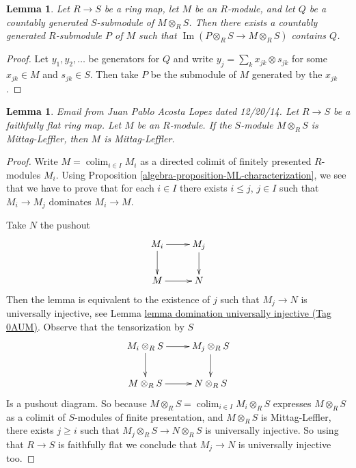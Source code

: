 \documentclass{amsart}
\newenvironment{reference}{\comment}{\endcomment}
\theoremstyle{plain}
\newtheorem{lemma}[subsection]{Lemma}
\theoremstyle{definition}
\theoremstyle{remark}
\numberwithin{equation}{subsection}
\def\colim{\mathop{\mathrm{colim}}\nolimits}
\def\Im{\mathop{\mathrm{Im}}}
\begin{document}
\begin{lemma}
\label{algebra-lemma-lift-countably-generated-submodule}
Let $R \to S$ be a ring map, let $M$ be an $R$-module, and let $Q$ be a
countably generated $S$-submodule of $M \otimes_R S$.  Then there exists a
countably generated $R$-submodule $P$ of $M$ such that
$\Im(P \otimes_R S \to M \otimes_R S)$ contains $Q$.
\end{lemma}

\begin{proof}
Let $y_1, y_2, \ldots$ be generators for $Q$ and write $y_j = \sum_k x_{jk}
\otimes s_{jk}$ for some $x_{jk} \in M$ and $s_{jk} \in S$. Then take $P$ be
the submodule of $M$ generated by the $x_{jk}$.
\end{proof}


\begin{lemma}
\label{algebra-lemma-ffdescent-ML}
\begin{reference}
Email from Juan Pablo Acosta Lopez dated 12/20/14.
\end{reference}
Let $R \to S$ be a faithfully flat ring map. Let $M$ be an $R$-module. If the
$S$-module $M \otimes_R S$ is Mittag-Leffler, then $M$ is Mittag-Leffler.
\end{lemma}

\begin{proof}
Write $M = \colim_{i\in I} M_i$ as a directed colimit
of finitely presented $R$-modules $M_i$.
Using Proposition \ref{algebra-proposition-ML-characterization}, we see that we
have to prove that for each $i \in I$ there exists $i \leq j$, $j\in I$
such that $M_i\rightarrow M_j$ dominates $M_i\rightarrow M$.

\medskip\noindent
Take $N$ the pushout
$$
\xymatrix{
M_i  \ar[r] \ar[d] & M_j \ar[d] \\
M \ar[r] & N
}
$$
Then the lemma is equivalent to the existence of $j$ such that
$M_j\rightarrow N$ is universally injective, see
Lemma \href{https://stacks.math.columbia.edu/tag/0AUM}{lemma domination universally injective (Tag 0AUM)}.
Observe that the tensorization by $S$
$$
\xymatrix{
M_i\otimes_R S  \ar[r] \ar[d] & M_j\otimes_R S \ar[d] \\
M\otimes_R S \ar[r] & N\otimes_R S
}
$$
Is a pushout diagram.  So because
$M \otimes_R S = \colim_{i\in I} M_i \otimes_R S$
expresses $M\otimes_R S$ as a colimit of $S$-modules of
finite presentation, and $M\otimes_R S$ is Mittag-Leffler,
there exists $j \geq i$ such that $M_j\otimes_R S\rightarrow N\otimes_R S$
is universally injective. So using that $R\rightarrow S$ is faithfully flat
we conclude that $M_j\rightarrow N$ is universally injective too.
\end{proof}
\end{document}
